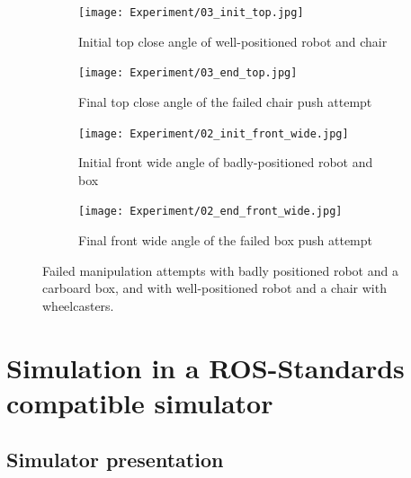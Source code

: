 \begin{figure}[H]

\begin{subfigure}{0.18\textwidth}
\texttt{[image: Experiment/03\_init\_top.jpg]}
\caption{Initial top close angle of well-positioned robot and chair} \label{fig:03_init_top}
\end{subfigure}\hspace*{\fill}
\begin{subfigure}{0.18\textwidth}
\texttt{[image: Experiment/03\_end\_top.jpg]}
\caption{Final top close angle of the failed chair push attempt} \label{fig:03_end_top}
\end{subfigure}\hspace*{\fill}
\begin{subfigure}{0.18\textwidth}
\texttt{[image: Experiment/02\_init\_front\_wide.jpg]}
\caption{Initial front wide angle of badly-positioned robot and box} \label{fig:02_init_front_wide}
\end{subfigure}\hspace*{\fill}
\begin{subfigure}{0.18\textwidth}
\texttt{[image: Experiment/02\_end\_front\_wide.jpg]}
\caption{Final front wide angle of the failed box push attempt} \label{fig:02_end_front_wide}
\end{subfigure}

\caption{Failed manipulation attempts with badly positioned robot and a carboard box, and with well-positioned robot and a chair with wheelcasters.} \label{fig:failed_attempts}
\end{figure}

\section{Simulation in a ROS-Standards compatible simulator}

\subsection{Simulator presentation}


